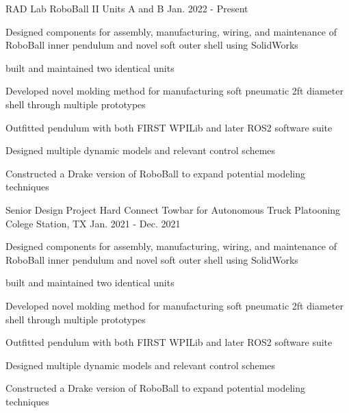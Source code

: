 


\cventry
{RAD Lab} %
{RoboBall II Units A and B} %
{} %
{Jan. 2022 - Present} %
{ %
\begin{cvitems}
\item {Designed components for assembly, manufacturing, wiring, and maintenance of RoboBall inner pendulum and novel soft outer shell using SolidWorks}
\item {built and maintained two identical units}
\item {Developed novel molding method for manufacturing soft pneumatic 2ft diameter shell through multiple prototypes}
\item {Outfitted pendulum with both FIRST WPILib and later ROS2 software suite}
\item {Designed multiple dynamic models and relevant control schemes}
\item {Constructed a Drake version of RoboBall to expand potential modeling techniques}
\end{cvitems}
}


\cventry
{Senior Design Project} %
{Hard Connect Towbar for Autonomous Truck Platooning} %
{Colege Station, TX} %
{Jan. 2021 - Dec. 2021} %
{ %
\begin{cvitems}
\item {Designed components for assembly, manufacturing, wiring, and maintenance of RoboBall inner pendulum and novel soft outer shell using SolidWorks}
\item {built and maintained two identical units}
\item {Developed novel molding method for manufacturing soft pneumatic 2ft diameter shell through multiple prototypes}
\item {Outfitted pendulum with both FIRST WPILib and later ROS2 software suite}
\item {Designed multiple dynamic models and relevant control schemes}
\item {Constructed a Drake version of RoboBall to expand potential modeling techniques}
\end{cvitems}
}

